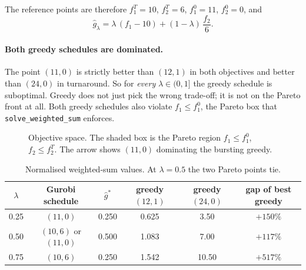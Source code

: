\documentclass[11pt,a4paper]{article}
\newcommand{\code}[1]{\texttt{#1}}
\begin{document}
The reference points are therefore $f_1^T=10$, $f_2^T=6$, $f_1^0=11$, $f_2^0=0$, and
\[
  \hat g_\lambda=\lambda\,(f_1-10)+(1-\lambda)\,\frac{f_2}{6}.
\]

\paragraph{Both greedy schedules are dominated.} The point $(11,0)$ is strictly
better than $(12,1)$ in both objectives and better than $(24,0)$ in
turnaround. So for \emph{every} $\lambda\in(0,1]$ the greedy schedule is
suboptimal. Greedy does not just pick the wrong trade-off; it is not on the
Pareto front at all. Both greedy schedules also violate $f_1\le f_1^0$, the
Pareto box that \code{solve\_weighted\_sum} enforces.

\begin{figure}[h]
\centering
{}
\caption{Objective space. The shaded box is the Pareto region $f_1\le f_1^0$,
$f_2\le f_2^T$. The arrow shows $(11,0)$ dominating the bursting greedy.}
\end{figure}

\begin{table}[h]
\centering
\begin{tabular}{cccccc}
\toprule
$\lambda$ & Gurobi schedule & $\hat g^\ast$ & greedy $(12,1)$ & greedy $(24,0)$ & gap of best greedy \\
\midrule
0.25 & $(11,0)$          & 0.250 & 0.625 & 3.50  & $+150\%$ \\
0.50 & $(10,6)$ or $(11,0)$ & 0.500 & 1.083 & 7.00 & $+117\%$ \\
0.75 & $(10,6)$          & 0.250 & 1.542 & 10.50 & $+517\%$ \\
\bottomrule
\end{tabular}
\caption{Normalised weighted-sum values. At $\lambda=0.5$ the two Pareto points
tie.}
\end{table}
\end{document}
